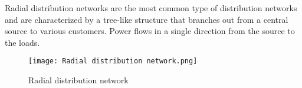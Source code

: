 Radial distribution networks are the most common type of distribution networks and are characterized by a tree-like structure that branches out from a central source to various customers. Power flows in a single direction from the source to the loads. \cite{PowerSystemAnalysis:1994}

\begin{figure}[h]
\texttt{[image: Radial distribution network.png]}
\label{fig:Radial distribution network}
\caption{Radial distribution network}
\end{figure}



\begin{comment}

potential sources
[2] T.A. Short, Power System Stability and Control, IEEE Press, 1993.
[3] J.K. Saini and P. Kundur, Power System Stability and Control, CRC Press, 2007.
[4] R. Lasseter and G. Andhankar, "Microgrids and Active Distribution Networks," IEEE Power and Energy Magazine, vol. 11, no. 3, pp. 40-50, 2013.
\end{comment}